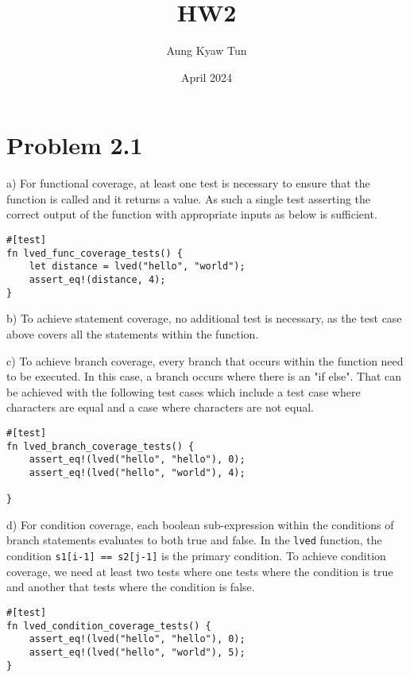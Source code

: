 \documentclass{article}
\title{HW2}
\author{Aung Kyaw Tun }
\date{April 2024}
\begin{document}
\maketitle

\section{Problem 2.1}

a) For functional coverage, at least one test is necessary to ensure that the function is called and it returns a value. As such a single test asserting the correct output of the function with  appropriate inputs as below is sufficient. 

\begin{verbatim}
#[test]
fn lved_func_coverage_tests() {
    let distance = lved("hello", "world");
    assert_eq!(distance, 4);
}
\end{verbatim}
\newline

b) To achieve statement coverage, no additional test is necessary, as the test case above covers all the statements within the function.\newline

c) To achieve branch coverage,  every branch that occurs within the function need to be executed. In this case, a branch occurs where there is an "if else".  That can be achieved with the following test cases which include a test case where characters are equal and a case where characters are not equal. 

\begin{verbatim}
#[test]
fn lved_branch_coverage_tests() {
    assert_eq!(lved("hello", "hello"), 0);
    assert_eq!(lved("hello", "world"), 4);
    
}
\end{verbatim}
\newline

d) For condition coverage, each boolean sub-expression within the conditions of branch statements evaluates to both true and false. In the \verb|lved| function, the condition \verb|s1[i-1] == s2[j-1]| is the primary condition. To achieve condition coverage, we need at least two tests where one tests where the condition is true and another that tests where the condition is false.

\begin{verbatim}
#[test]
fn lved_condition_coverage_tests() {
    assert_eq!(lved("hello", "hello"), 0);
    assert_eq!(lved("hello", "world"), 5);
}
\end{verbatim}
\end{document}
